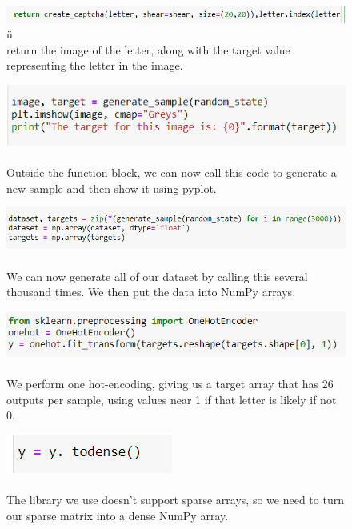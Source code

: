 \documentclass[onecolumn]{article}
\begin{document}
\newpage
\begin{figure}[ht]
    \centering
    \includegraphics[width=.8\linewidth]{23..png}
\caption{\label{fig:demo-bad}ü
\centering
\\\We return the image of the letter, along with the target value representing the letter in the image.}
\end{figure}

\begin{figure}[h]
    \centering
    \includegraphics[width=.8\linewidth]{24..png}
\caption{\label{fig:demo-bad}
\centering
\\Outside the function block, we can now call this code to generate a new sample and then show it using pyplot.}
\end{figure}

\begin{figure}[h]
    \centering
    \includegraphics[width=.9\linewidth]{25..png}
\caption{\label{fig:demo-bad}
\centering
\\We can now generate all of our dataset by calling this several thousand times.
We then put the data into NumPy arrays.}
\end{figure}

\begin{figure}[hb!]
    \centering
    \includegraphics[width=.8\linewidth]{26..png}
\caption{\label{fig:demo-bad}
\centering
\\We perform one hot-encoding, giving us a target array that has 26 outputs per sample, using values near 1 if that letter is likely if not 0.}
\end{figure}

\begin{figure}[hb!]
    \centering
    \includegraphics[width=.4\linewidth]{27..png}
\caption{\label{fig:demo-bad}
\centering
\\The library we use doesn't support sparse arrays, so we need to turn our sparse matrix into a dense NumPy array.}
\end{figure}
\end{document}
